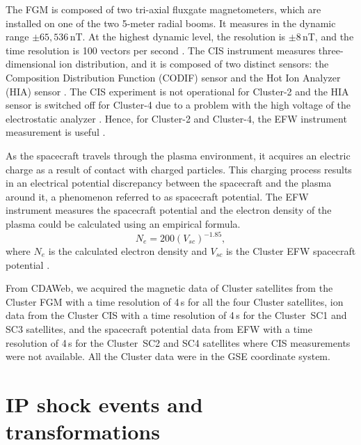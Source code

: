 \documentclass[draft]{agujournal2019}
\begin{document}
The FGM is composed of two tri-axial fluxgate magnetometers, which are installed on one of the two 5-meter radial booms. It measures in the dynamic range $\pm 65,536$\,nT. At the highest dynamic level, the resolution is  $\pm8$\,nT, and the time resolution is 100 vectors per second \cite{balogh97:_clust_magnet_field_inves,organization21:_fluxg_magnet_fgm}. The CIS instrument measures three-dimensional ion distribution, and it is composed of two distinct sensors: the Composition Distribution Function (CODIF) sensor and the Hot Ion Analyzer (HIA) sensor \cite{reme97:_clust_ion_spect_exper}. The CIS experiment is not operational for Cluster-2 and the HIA sensor is switched off for Cluster-4 due to a problem with the high voltage of the electrostatic analyzer \cite{team21:_clust_activ_archiv}. Hence, for Cluster-2 and Cluster-4, the EFW instrument measurement is useful \cite{gustafsson97:_elect_field_wave_exper_clust_mission}.

As the spacecraft travels through the plasma environment, it acquires an electric charge as a result of contact with charged particles. This charging process results in an electrical potential discrepancy between the spacecraft and the plasma around it, a phenomenon referred to as spacecraft potential.  The EFW instrument measures the spacecraft potential and the electron density of the plasma could be calculated using an empirical formula.
\begin{equation}\label{eq:empdens}
N_{e}=200(V_{sc})^{-1.85},
\end{equation}
where $N_{e}$ is the calculated electron density and $V_{sc}$ is the Cluster EFW spacecraft potential \cite{sandhu16:_clust,trotignon10:_whisp_relax_sound_clust_activ_archiv,trotignon11:_calib_repor_whisp_measur_clust}. 

From CDAWeb, we acquired the magnetic data of Cluster satellites from the Cluster FGM with a time resolution of 4\,s for all the four Cluster satellites, ion data from the Cluster CIS with a time resolution of 4\,s for the Cluster~SC1 and SC3 satellites, and the spacecraft potential data from EFW with a time resolution of 4\,s for the Cluster~SC2 and SC4 satellites where CIS measurements were not available. All the Cluster data were in the GSE coordinate system.  

\section{IP shock events and transformations}
\label{sec:ipshock}
\end{document}
